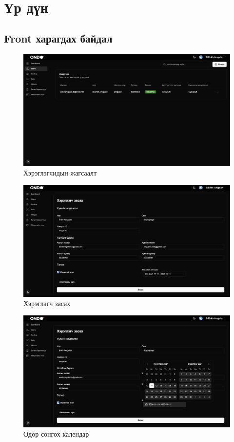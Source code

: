 \section{Үр дүн}


\subsection{Front харагдах байдал}

\begin{figure}
	\centering
	\includegraphics[width=15cm]{images/main.png}
	\caption{Хэрэглэгчидын жагсаалт}
\end{figure}


\begin{figure}
	\centering
	\includegraphics[width=15cm]{images/front.png}
	\caption{Хэрэглэгч засах}
\end{figure}

\begin{figure}
	\centering
	\includegraphics[width=15cm]{images/calendar.png}
	\caption{Өдөр сонгох календар}
\end{figure}

